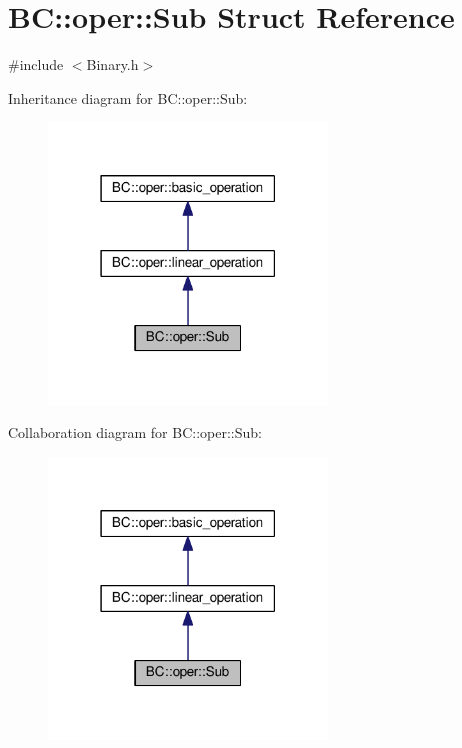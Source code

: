 \hypertarget{structBC_1_1oper_1_1Sub}{}\section{BC\+:\+:oper\+:\+:Sub Struct Reference}
\label{structBC_1_1oper_1_1Sub}


{\ttfamily \#include $<$Binary.\+h$>$}



Inheritance diagram for BC\+:\+:oper\+:\+:Sub\+:
\nopagebreak
\begin{figure}[H]
\begin{center}
\leavevmode
\includegraphics[width=210pt]{structBC_1_1oper_1_1Sub__inherit__graph}
\end{center}
\end{figure}


Collaboration diagram for BC\+:\+:oper\+:\+:Sub\+:
\nopagebreak
\begin{figure}[H]
\begin{center}
\leavevmode
\includegraphics[width=210pt]{structBC_1_1oper_1_1Sub__coll__graph}
\end{center}
\end{figure}
